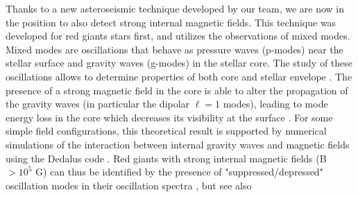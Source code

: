 Thanks to a new asteroseismic technique developed by our team, we are now in the position to also detect strong internal magnetic fields.
This technique was developed for red giants stars first, and utilizes the observations of mixed modes. Mixed modes are
oscillations that behave as pressure waves (p-modes) near the stellar surface and gravity waves (g-modes) in the stellar core.
The study of these oscillations allows to determine properties of both core and stellar envelope \citep[e.g][]{Beck_2011}.
The presence of a strong magnetic field in the core is able to alter the propagation of the gravity waves (in particular the dipolar $\ell =1$ modes),
leading to mode energy loss in the core which decreases its visibility at the surface \citep{Fuller_2015}.
For some simple field configurations, this theoretical result is supported  by numerical simulations of the interaction between
internal gravity waves and magnetic fields using the Dedalus code \citep{Lecoanet_2016}.
Red giants with strong internal magnetic fields (B $> 10^5$ G) can thus be identified by the presence of "suppressed/depressed" oscillation modes in their oscillation spectra \citep[see e.g.][]{Garc_a_2014}, but see also 

